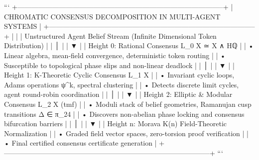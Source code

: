 \documentclass[11pt,twoside,openright]{amsbook}
\begin{document}
{{```
+-----------------------------------------------------------------------------------------+
|                  CHROMATIC CONSENSUS DECOMPOSITION IN MULTI-AGENT SYSTEMS              |
+-----------------------------------------------------------------------------------------+
|                                                                                         |
|  Unstructured Agent Belief Stream (Infinite Dimensional Token Distribution)            |
|                                     │                                                   |
|                                     ▼                                                   |
|  Height 0: Rational Consensus L_0 X ≃ X ∧ Hℚ                                            |
|  • Linear algebra, mean-field convergence, deterministic token routing                  |
|  • Susceptible to topological phase slips and non-linear deadlock                       |
|                                     │                                                   |
|                                     ▼                                                   |
|  Height 1: K-Theoretic Cyclic Consensus L_1 X                                           |
|  • Invariant cyclic loops, Adams operations ψ^k, spectral clustering                    |
|  • Detects discrete limit cycles, agent round-robin coordination                        |
|                                     │                                                   |
|                                     ▼                                                   |
|  Height 2: Elliptic & Modular Consensus L_2 X (tmf)                                     |
|  • Moduli stack of belief geometries, Ramanujan cusp transitions Δ ∈ π_24               |
|  • Discovers non-abelian phase locking and consensus bifurcation barriers               |
|                                     │                                                   |
|                                     ▼                                                   |
|  Height n: Morava K(n) Field-Theoretic Normalization                                    |
|  • Graded field vector spaces, zero-torsion proof verification                          |
|  • Final certified consensus certificate generation                                     |
+-----------------------------------------------------------------------------------------+
```

}}
\end{document}
